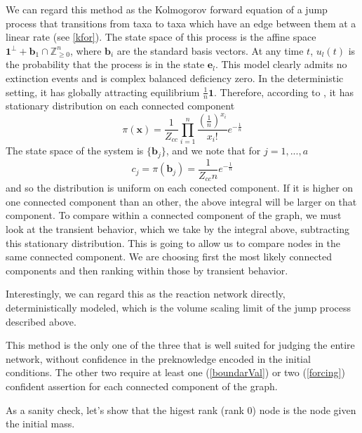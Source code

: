 \documentclass[10pt]{article}
\theoremstyle{definition}
\numberwithin{theorem}{section}
\numberwithin{definition}{section}
\numberwithin{lemma}{section}
\numberwithin{corollary}{section}
\numberwithin{clm}{section}
\numberwithin{rmk}{section}
\renewcommand{\b}{\bm}
\newcommand{\bZ}{\mathbb{Z}}
\begin{document}
We can regard this method as the Kolmogorov forward equation of a jump process that transitions from taxa to taxa which have an edge between them at a linear rate (see \cref{kfor}). The state space of this process is the affine space $\b{1}^{\perp} + \b{b}_1\cap \bZ^n_{\geq 0}$, where $\b{b}_i$ are the standard basis vectors. At any time $t$, $u_l(t)$ is the probability that the process is in the state $\b{e}_l$. This model clearly admits no extinction events and is complex balanced deficiency zero. In the deterministic setting, it has globally attracting equilibrium $\frac{1}{n}\b{1}$. Therefore, according to \cite{Anderson2010}, it has stationary distribution on each connected component
\[
\pi(\b{x}) = \frac{1}{Z_{cc}} \prod_{i=1}^n \frac{\left(\frac{1}{n}\right)^{x_i}}{x_i!}e^{-\frac{1}{n}}
\]
The state space of the system is $\{\b{b}_j\}$, and we note that for $j = 1,...,a$
\[
c_j = \pi(\b{b}_j) = \frac{1}{Z_{cc} n}e^{-\frac{1}{n}}
\]
and so the distribution is uniform on each conected component. If it is higher on one connected  component than an other, the above integral will be larger on that component. To compare within a connected component of the graph, we must look at the transient behavior, which we take by the integral above, subtracting this stationary distribution. This is going to allow us to compare nodes in the same connected component. We are choosing first the most likely connected components and then ranking within those by transient behavior. 

Interestingly, we can regard this as the reaction network directly, deterministically modeled, which is the volume scaling limit of the jump process described above.

This method is the only one of the three that is well suited for judging the entire network, without confidence in the preknowledge encoded in the initial conditions. The other two require at least one (\cref{boundarVal}) or two (\cref{forcing}) confident assertion for each connected component of the graph.


	As a sanity check, let's show that the higest rank (rank $0$) node is the node given the initial mass.
	
\end{document}

